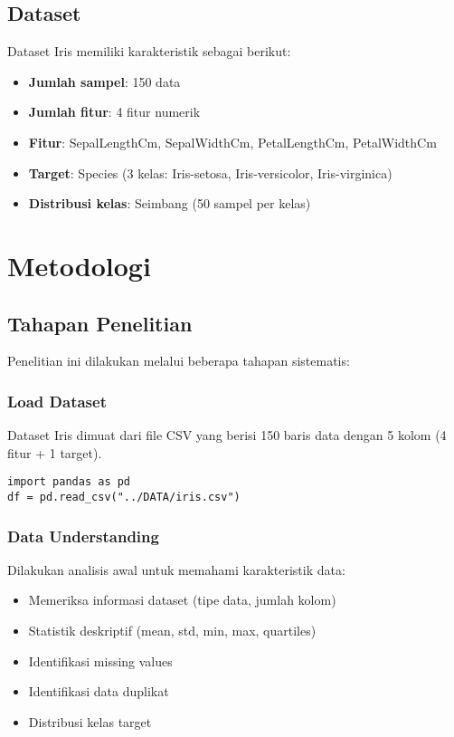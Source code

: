 \documentclass[11pt,a4paper]{article}
\begin{document}
\subsection{Dataset}
Dataset Iris memiliki karakteristik sebagai berikut:
\begin{itemize}
    \item \textbf{Jumlah sampel}: 150 data
    \item \textbf{Jumlah fitur}: 4 fitur numerik
    \item \textbf{Fitur}: SepalLengthCm, SepalWidthCm, PetalLengthCm, PetalWidthCm
    \item \textbf{Target}: Species (3 kelas: Iris-setosa, Iris-versicolor, Iris-virginica)
    \item \textbf{Distribusi kelas}: Seimbang (50 sampel per kelas)
\end{itemize}

\section{Metodologi}

\subsection{Tahapan Penelitian}
Penelitian ini dilakukan melalui beberapa tahapan sistematis:

\subsubsection{Load Dataset}
Dataset Iris dimuat dari file CSV yang berisi 150 baris data dengan 5 kolom (4 fitur + 1 target).

\begin{lstlisting}
import pandas as pd
df = pd.read_csv("../DATA/iris.csv")
\end{lstlisting}

\subsubsection{Data Understanding}
Dilakukan analisis awal untuk memahami karakteristik data:
\begin{itemize}
    \item Memeriksa informasi dataset (tipe data, jumlah kolom)
    \item Statistik deskriptif (mean, std, min, max, quartiles)
    \item Identifikasi missing values
    \item Identifikasi data duplikat
    \item Distribusi kelas target
\end{itemize}
\end{document}
